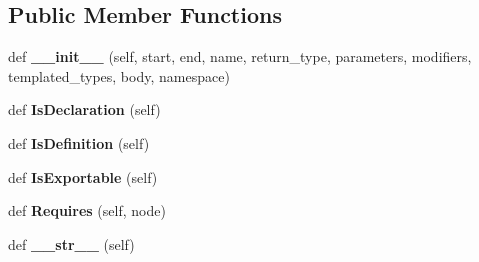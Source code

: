 \subsection*{Public Member Functions}
\begin{DoxyCompactItemize}
\item 
\mbox{\label{classtests_1_1libs_1_1googletest-master_1_1googlemock_1_1scripts_1_1generator_1_1cpp_1_1ast_1_1Function_aacc3ca953164e45477bbe215c56381db}} 
def {\bfseries \+\_\+\+\_\+init\+\_\+\+\_\+} (self, start, end, name, return\+\_\+type, parameters, modifiers, templated\+\_\+types, body, namespace)
\item 
\mbox{\label{classtests_1_1libs_1_1googletest-master_1_1googlemock_1_1scripts_1_1generator_1_1cpp_1_1ast_1_1Function_a5e2f0e2bcc9281aa166151062ada4ce9}} 
def {\bfseries Is\+Declaration} (self)
\item 
\mbox{\label{classtests_1_1libs_1_1googletest-master_1_1googlemock_1_1scripts_1_1generator_1_1cpp_1_1ast_1_1Function_a176ee1261fa4275a559e7cb991812a89}} 
def {\bfseries Is\+Definition} (self)
\item 
\mbox{\label{classtests_1_1libs_1_1googletest-master_1_1googlemock_1_1scripts_1_1generator_1_1cpp_1_1ast_1_1Function_ac618503f56558f99323ff9ece19c8b04}} 
def {\bfseries Is\+Exportable} (self)
\item 
\mbox{\label{classtests_1_1libs_1_1googletest-master_1_1googlemock_1_1scripts_1_1generator_1_1cpp_1_1ast_1_1Function_a107ffe90c3f69db6f3d380dd555339ae}} 
def {\bfseries Requires} (self, node)
\item 
\mbox{\label{classtests_1_1libs_1_1googletest-master_1_1googlemock_1_1scripts_1_1generator_1_1cpp_1_1ast_1_1Function_a5c4900ecf9299d2b7d7ce8083c06580e}} 
def {\bfseries \+\_\+\+\_\+str\+\_\+\+\_\+} (self)
\end{DoxyCompactItemize}
